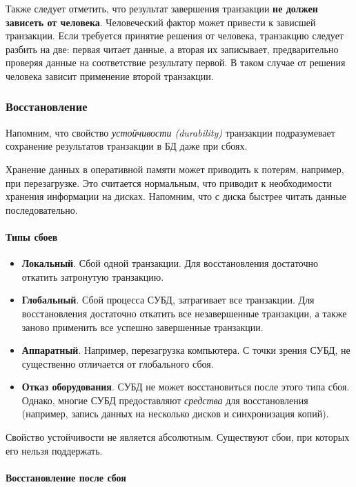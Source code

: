 Также следует отметить, что результат завершения транзакции \textbf{не должен зависеть от человека}. Человеческий
фактор может привести к зависшей транзакции. Если требуется принятие решения от человека,
транзакцию следует разбить на две: первая читает данные, а вторая их записывает, предварительно
проверяя данные на соответствие результату первой. В таком случае от решения человека зависит
применение второй транзакции.

\subsubsection{Восстановление}

Напомним, что свойство \textit{устойчивости (durability)} транзакции подразумевает сохранение результатов
транзакции в БД даже при сбоях.

Хранение данных в оперативной памяти может приводить к потерям, например, при перезагрузке. Это
считается нормальным, что приводит к необходимости хранения информации на дисках. Напомним, что с
диска быстрее читать данные последовательно.

\paragraph{Типы сбоев}

\begin{itemize}
	\item \textbf{Локальный}. Сбой одной транзакции. Для восстановления
	      достаточно откатить затронутую транзакцию.
	\item \textbf{Глобальный}. Сбой процесса СУБД, затрагивает все транзакции.
	      Для восстановления достаточно откатить все незавершенные транзакции, а также заново применить все
	      успешно завершенные транзакции.
	\item \textbf{Аппаратный}. Например, перезагрузка компьютера. С точки
	      зрения СУБД, не существенно отличается от глобального сбоя.
	\item \textbf{Отказ оборудования}. СУБД не может восстановиться после этого
	      типа сбоя. Однако, многие СУБД предоставляют \textit{средства} для восстановления (например,
	      запись данных на несколько дисков и синхронизация копий).
\end{itemize}

Свойство устойчивости не является абсолютным. Существуют сбои, при которых его нельзя поддержать.

\paragraph{Восстановление после сбоя}

